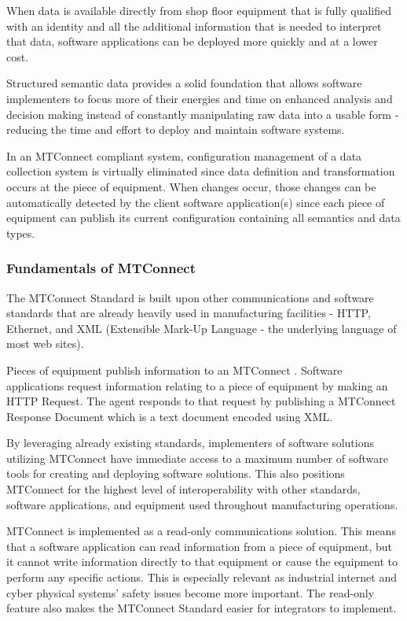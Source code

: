 When data is available directly from shop floor equipment that is fully qualified with an identity and all the  additional information that is needed to interpret that data, software applications can be deployed more quickly and at a lower cost.    

Structured semantic data provides a solid foundation that allows software implementers to focus more of their energies and time on enhanced analysis and decision making instead of constantly manipulating raw data into a usable form - reducing the time and effort to deploy and maintain software systems.  
 
In an MTConnect compliant system, configuration management of a data collection system is virtually eliminated since data definition and transformation occurs at the piece of equipment.   When changes occur, those changes can be automatically detected by the client software application(s) since each piece of equipment can publish its current configuration containing all semantics and data types.

\subsubsection{Fundamentals of MTConnect}

The MTConnect Standard is built upon other communications and software standards that are already heavily used in manufacturing facilities - HTTP, Ethernet, and XML (Extensible Mark-Up Language - the underlying language of most web sites).
 
Pieces of equipment publish information to an MTConnect .  Software applications request information relating to a piece of equipment by making an HTTP Request. The agent responds to that request by publishing a MTConnect Response Document which is a text document encoded using XML.   
 
By leveraging already existing standards, implementers of software solutions utilizing MTConnect have immediate access to a maximum number of software tools for creating and deploying software solutions.   This also positions MTConnect for the highest level of interoperability with other standards, software applications, and equipment used throughout manufacturing operations.    
 
MTConnect is implemented as a read-only communications solution.   This means that a software application can read information from a piece of equipment, but it cannot write information directly to that equipment or cause the equipment to perform any specific actions.  This is especially relevant as industrial internet and cyber physical systems' safety issues become more important.  The read-only feature also makes the MTConnect Standard easier for integrators to implement. 
 
